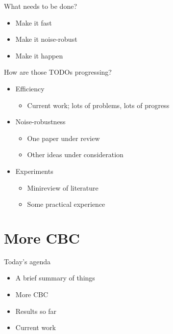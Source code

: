 \documentclass[presentation]{beamer}
\begin{document}
\begin{frame}[label={sec:orgb43d141}]{What needs to be done?}
\begin{itemize}
\item Make it fast
\end{itemize}
\vfill
\begin{itemize}
\item Make it noise-robust
\end{itemize}
\vfill
\begin{itemize}
\item Make it happen
\end{itemize}
\end{frame}

\begin{frame}[label={sec:org252cf7d}]{How are those TODOs progressing?}
\begin{itemize}
\item Efficiency
\begin{itemize}
\item Current work; lots of problems, lots of progress
\end{itemize}
\end{itemize}
\vfill
\begin{itemize}
\item Noise-robustness
\begin{itemize}
\item One paper under review
\item Other ideas under consideration
\end{itemize}
\end{itemize}
\vfill
\begin{itemize}
\item Experiments
\begin{itemize}
\item Minireview of literature
\item Some practical experience
\end{itemize}
\end{itemize}
\end{frame}

\section{More CBC}
\label{sec:org2046c6d}
\begin{frame}[label={sec:orgdfd8a36}]{Today's agenda}
\begin{itemize}
\item A brief summary of things
\end{itemize}
\vfill
\begin{itemize}
\item \alert{More CBC}
\end{itemize}
\vfill
\begin{itemize}
\item Results so far
\end{itemize}
\vfill
\begin{itemize}
\item Current work
\end{itemize}
\vfill
\end{frame}
\end{document}
